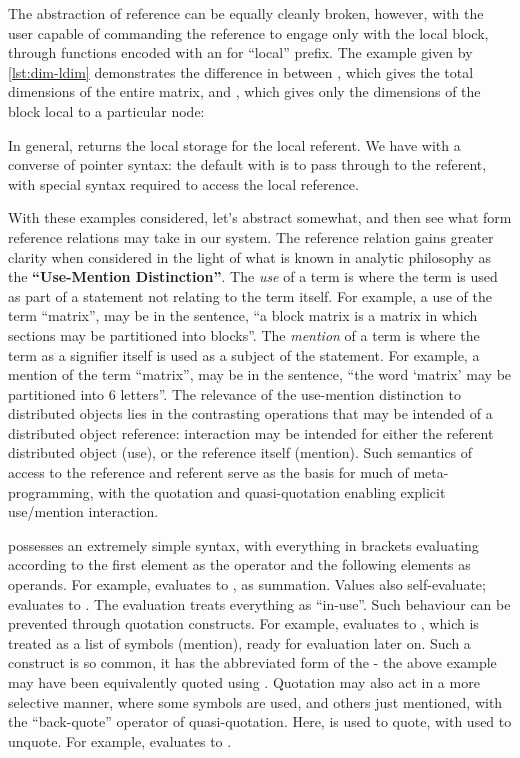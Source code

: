 The abstraction of reference can be equally cleanly broken, however, with the user capable of commanding the reference to engage only with the local block, through functions encoded with an  for ``local'' prefix.
The example given by \cref{lst:dim-ldim} demonstrates the difference in  between , which gives the total dimensions of the entire matrix, and , which gives only the dimensions of the block local to a particular node:


In general,  returns the local storage for the  local referent.
We have with  a converse of pointer syntax: the default with  is to pass through to the referent, with special syntax required to access the local reference.

With these examples considered, let's abstract somewhat, and then see what form reference relations may take in our system.
The reference relation gains greater clarity when considered in the light of what is known in analytic philosophy as the \textbf{``Use-Mention Distinction''}\cite{quine2009}.
The \emph{use} of a term is where the term is used as part of a statement not relating to the term itself.
For example, a use of the term ``matrix'', may be in the sentence, ``a block matrix is a matrix in which sections may be partitioned into blocks''.
The \emph{mention} of a term is where the term as a signifier itself is used as a subject of the statement.
For example, a mention of the term ``matrix'', may be in the sentence, ``the word `matrix' may be partitioned into 6 letters''.
The relevance of the use-mention distinction to distributed objects lies in the contrasting operations that may be intended of a distributed object reference: interaction may be intended for either the referent distributed object (use), or the reference itself (mention).
Such semantics of access to the reference and referent serve as the basis for much of meta-programming, with the  quotation and quasi-quotation enabling explicit use/mention interaction.

 possesses an extremely simple syntax, with everything in brackets evaluating according to the first element as the operator and the following elements as operands.
For example,  evaluates to , as summation.
Values also self-evaluate;  evaluates to .
The evaluation treats everything as ``in-use''.
Such behaviour can be prevented through quotation constructs.
For example,  evaluates to , which is treated as a list of symbols (mention), ready for evaluation later on.
Such a construct is so common, it has the abbreviated form of the  - the above example may have been equivalently quoted using . Quotation may also act in a more selective manner, where some symbols are used, and others just mentioned, with the ``back-quote'' operator of quasi-quotation.
Here,  is used to quote, with  used to unquote.
For example,  evaluates to .

